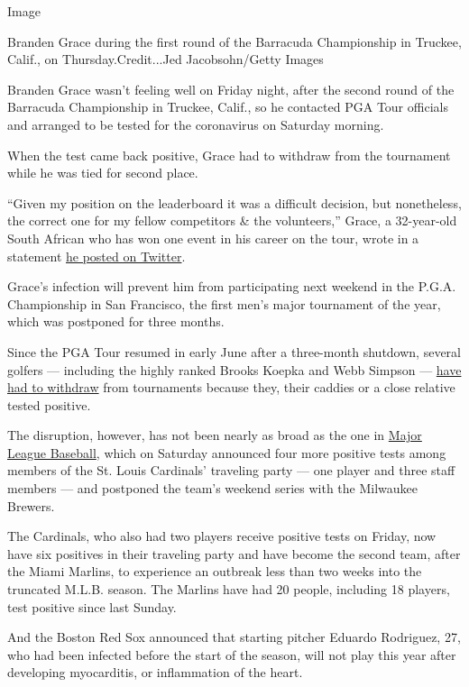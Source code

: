 Image

Branden Grace during the first round of the Barracuda Championship in
Truckee, Calif., on Thursday.Credit...Jed Jacobsohn/Getty Images

Branden Grace wasn't feeling well on Friday night, after the second
round of the Barracuda Championship in Truckee, Calif., so he contacted
PGA Tour officials and arranged to be tested for the coronavirus on
Saturday morning.

When the test came back positive, Grace had to withdraw from the
tournament while he was tied for second place.

``Given my position on the leaderboard it was a difficult decision, but
nonetheless, the correct one for my fellow competitors \& the
volunteers,'' Grace, a 32-year-old South African who has won one event
in his career on the tour, wrote in a statement
\href{https://twitter.com/BrandenGrace/status/1289689928180404230?s=20}{he
posted on Twitter}.

Grace's infection will prevent him from participating next weekend in
the P.G.A. Championship in San Francisco, the first men's major
tournament of the year, which was postponed for three months.

Since the PGA Tour resumed in early June after a three-month shutdown,
several golfers --- including the highly ranked Brooks Koepka and Webb
Simpson ---
\href{https://www.nytimes3xbfgragh.onion/2020/06/26/sports/golf/pga-golfer-positive-tests.html}{have
had to withdraw} from tournaments because they, their caddies or a close
relative tested positive.

The disruption, however, has not been nearly as broad as the one in
\href{https://www.nytimes3xbfgragh.onion/2020/08/01/sports/baseball/coronavirus-cardinals.html}{Major
League Baseball}, which on Saturday announced four more positive tests
among members of the St. Louis Cardinals' traveling party --- one player
and three staff members --- and postponed the team's weekend series with
the Milwaukee Brewers.

The Cardinals, who also had two players receive positive tests on
Friday, now have six positives in their traveling party and have become
the second team, after the Miami Marlins, to experience an outbreak less
than two weeks into the truncated M.L.B. season. The Marlins have had 20
people, including 18 players, test positive since last Sunday.

And the Boston Red Sox announced that starting pitcher Eduardo
Rodriguez, 27, who had been infected before the start of the season,
will not play this year after developing myocarditis, or inflammation of
the heart.

